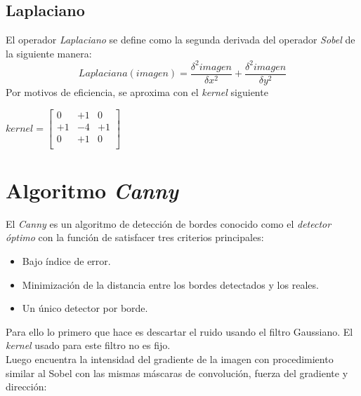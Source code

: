 \subsection{Laplaciano}
El operador \emph{Laplaciano} se define como la segunda derivada del
operador \emph{Sobel} de la siguiente manera:
\begin{equation*}
  Laplaciana(imagen) = \frac{\delta^{2} imagen}{\delta x^{2}} + \frac{\delta^{2} imagen}{\delta y^{2}}
\end{equation*}
Por motivos de eficiencia, se aproxima con el \emph{kernel} siguiente
\begin{center}
  $ kernel = \begin{bmatrix}
    0 & +1 & 0 \\
    +1 & -4 & +1 \\
    0 & +1 & 0 \\
  \end{bmatrix}
  $
\end{center}

\section{Algoritmo \emph{Canny}}
El \emph{Canny} es un algoritmo de detección de bordes conocido como
el \emph{detector óptimo} con la función de satisfacer tres criterios
principales:
\begin{itemize}
\item Bajo índice de error.
\item Minimización de la distancia entre los bordes detectados y los
  reales.
\item Un único detector por borde.
\end{itemize}
Para ello lo primero que hace es descartar el ruido usando el filtro
Gaussiano.
El \emph{kernel} usado para este filtro no es fijo.\\
Luego encuentra la intensidad del gradiente de la imagen con
procedimiento similar al Sobel con las mismas máscaras de convolución,
fuerza del gradiente
y dirección:\\
